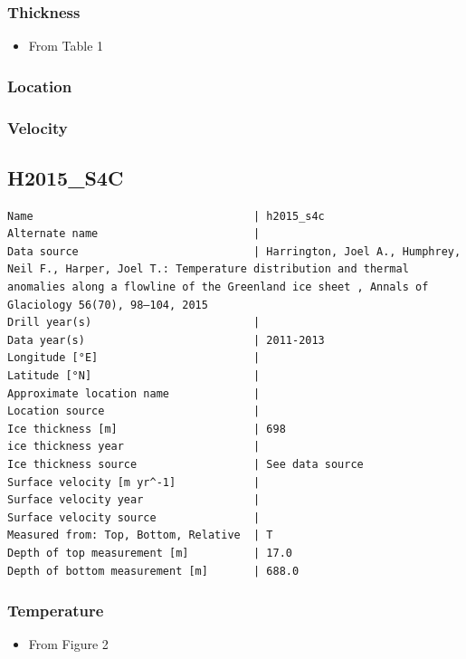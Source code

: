 \documentclass[article,a4paper,times,11pt,twoside]{article}
\begin{document}
\subsubsection{Thickness}
\label{sec:org83edd08}

\begin{itemize}
\item From \textcite{harrington_2015} Table 1
\end{itemize}

\subsubsection{Location}
\label{sec:org5ad6ab1}

\subsubsection{Velocity}
\label{sec:orgc7b9276}
\clearpage
\subsection{H2015\_S4C}
\label{sec:orgc491906}
\begin{verbatim}
Name                                  | h2015_s4c
Alternate name                        | 
Data source                           | Harrington, Joel A., Humphrey, Neil F., Harper, Joel T.: Temperature distribution and thermal anomalies along a flowline of the Greenland ice sheet , Annals of Glaciology 56(70), 98–104, 2015 
Drill year(s)                         | 
Data year(s)                          | 2011-2013
Longitude [°E]                        | 
Latitude [°N]                         | 
Approximate location name             | 
Location source                       | 
Ice thickness [m]                     | 698
ice thickness year                    | 
Ice thickness source                  | See data source
Surface velocity [m yr^-1]            | 
Surface velocity year                 | 
Surface velocity source               | 
Measured from: Top, Bottom, Relative  | T
Depth of top measurement [m]          | 17.0
Depth of bottom measurement [m]       | 688.0
\end{verbatim}

\subsubsection{Temperature}
\label{sec:org0fcae09}

\begin{itemize}
\item From \textcite{harrington_2015} Figure 2
\end{itemize}
\end{document}
